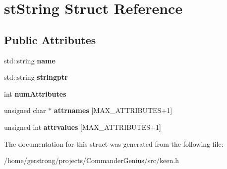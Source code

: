 \hypertarget{structst_string}{
\section{stString Struct Reference}
\label{structst_string}
}
\subsection*{Public Attributes}
\begin{DoxyCompactItemize}
\item 
\hypertarget{structst_string_a1473e5e9b78f449c772c22ea5676bfff}{
std::string {\bfseries name}}
\label{structst_string_a1473e5e9b78f449c772c22ea5676bfff}

\item 
\hypertarget{structst_string_a06721e1c4b677d14945197cc008f637e}{
std::string {\bfseries stringptr}}
\label{structst_string_a06721e1c4b677d14945197cc008f637e}

\item 
\hypertarget{structst_string_aa5c3220278e5c05fe66021efac2b6168}{
int {\bfseries numAttributes}}
\label{structst_string_aa5c3220278e5c05fe66021efac2b6168}

\item 
\hypertarget{structst_string_a7a8cc22811ffeefa95072bacf59e277d}{
unsigned char $\ast$ {\bfseries attrnames} \mbox{[}MAX\_\-ATTRIBUTES+1\mbox{]}}
\label{structst_string_a7a8cc22811ffeefa95072bacf59e277d}

\item 
\hypertarget{structst_string_ad4ea82189b4fac24bfd16b149649ab6e}{
unsigned int {\bfseries attrvalues} \mbox{[}MAX\_\-ATTRIBUTES+1\mbox{]}}
\label{structst_string_ad4ea82189b4fac24bfd16b149649ab6e}

\end{DoxyCompactItemize}


The documentation for this struct was generated from the following file:\begin{DoxyCompactItemize}
\item 
/home/gerstrong/projects/CommanderGenius/src/keen.h\end{DoxyCompactItemize}
